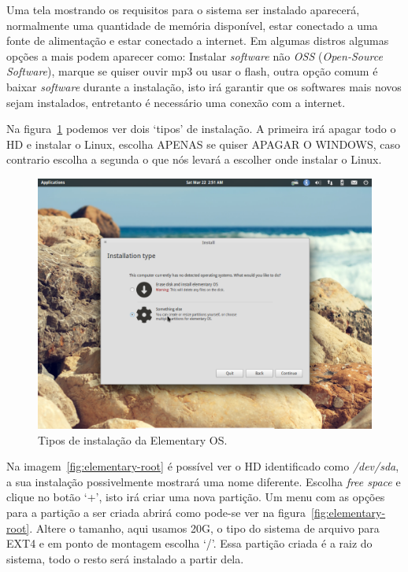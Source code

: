 \documentclass{handout_utfpr}
\begin{document}
Uma tela mostrando os requisitos para o sistema ser instalado aparecerá, normalmente uma quantidade de memória disponível, estar conectado a uma fonte de alimentação e estar conectado a internet. Em algumas distros algumas opções a mais podem aparecer como: Instalar \emph{software} não \emph{OSS} (\emph{Open-Source Software}), marque se quiser ouvir mp3 ou usar o flash, outra opção comum é baixar \emph{software} durante a instalação, isto irá garantir que os softwares mais novos sejam instalados, entretanto é necessário uma conexão com a internet.

Na figura~\ref{fig:elementary-install} podemos ver dois `tipos' de instalação. A primeira irá apagar todo o HD e instalar o Linux, escolha APENAS se quiser APAGAR O WINDOWS, caso contrario escolha a segunda o que nós levará a escolher onde instalar o Linux.

\begin{figure}[H]
  \centering
  \includegraphics[scale=.3]{imagens/elementary-install-03.png}
  \caption{Tipos de instalação da Elementary OS\@.}
  \label{fig:elementary-install}
\end{figure}

Na imagem~\ref{fig:elementary-root} é possível ver o HD identificado como \emph{/dev/sda}, a sua instalação possivelmente mostrará uma nome diferente. Escolha \emph{free space} e clique no botão `+', isto irá criar uma nova partição. Um menu com as opções para a partição a ser criada abrirá como pode-se ver na figura~\ref{fig:elementary-root}. Altere o tamanho, aqui usamos 20G, o tipo do sistema de arquivo para EXT4 e em ponto de montagem escolha `/'. Essa partição criada é a raiz do sistema, todo o resto será instalado a partir dela.
\end{document}
